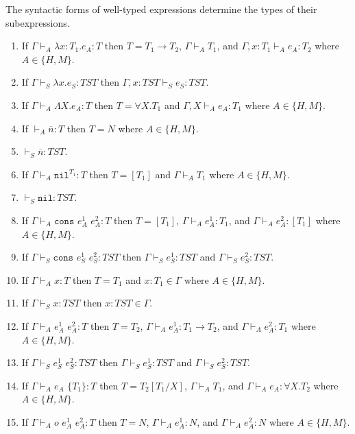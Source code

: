 \begin{lemma}
\label{i}
The syntactic forms of well-typed expressions determine the types of their subexpressions.
\begin{enumerate}
\item If $\Gamma\vdash_{A}\lambda x:T_{1}.e_{A}:T$ then $T=T_{1}\rightarrow T_{2}$, $\Gamma\vdash_{A}T_{1}$, and $\Gamma,x:T_{1}\vdash_{A}e_{A}:T_{2}$ where $A\in\lbrace H,M\rbrace$.
\item If $\Gamma\vdash_{S}\lambda x.e_{S}:TST$ then $\Gamma,x:TST\vdash_{S}e_{S}:TST$.
\item If $\Gamma\vdash_{A}\Lambda X.e_{A}:T$ then $T=\forall X.T_{1}$ and $\Gamma,X\vdash_{A}e_{A}:T_{1}$ where $A\in\lbrace H,M\rbrace$.
\item If $\vdash_{A}\overline{n}:T$ then $T=N$ where $A\in\lbrace H,M\rbrace$.
\item $\vdash_{S}\overline{n}:TST$.
\item If $\Gamma\vdash_{A}\mathtt{nil}^{T_{1}}:T$ then $T=[T_{1}]$ and $\Gamma\vdash_{A}T_{1}$ where $A\in\lbrace H,M\rbrace$.
\item $\vdash_{S}\mathtt{nil}:TST$.
\item If $\Gamma\vdash_{A}\mathtt{cons}$ $e_{A}^{1}$ $e_{A}^{2}:T$ then $T=[T_{1}]$, $\Gamma\vdash_{A}e_{A}^{1}:T_{1}$, and $\Gamma\vdash_{A}e_{A}^{2}:[T_{1}]$ where $A\in\lbrace H,M\rbrace$.
\item If $\Gamma\vdash_{S}\mathtt{cons}$ $e_{S}^{1}$ $e_{S}^{2}:TST$ then $\Gamma\vdash_{S}e_{S}^{1}:TST$ and $\Gamma\vdash_{S}e_{S}^{2}:TST$.
\item If $\Gamma\vdash_{A}x:T$ then $T=T_{1}$ and $x:T_{1}\in\Gamma$ where $A\in\lbrace H,M\rbrace$.
\item If $\Gamma\vdash_{S}x:TST$ then $x:TST\in\Gamma$.
\item If $\Gamma\vdash_{A}e_{A}^{1}$ $e_{A}^{2}:T$ then $T=T_{2}$, $\Gamma\vdash_{A}e_{A}^{1}:T_{1}\rightarrow T_{2}$, and $\Gamma\vdash_{A}e_{A}^{2}:T_{1}$ where $A\in\lbrace H,M\rbrace$.
\item If $\Gamma\vdash_{S}e_{S}^{1}$ $e_{S}^{2}:TST$ then $\Gamma\vdash_{S}e_{S}^{1}:TST$ and $\Gamma\vdash_{S}e_{S}^{2}:TST$.
\item If $\Gamma\vdash_{A}e_{A}$ $\lbrace T_{1}\rbrace:T$ then $T=T_{2}[T_{1}/X]$, $\Gamma\vdash_{A}T_{1}$, and $\Gamma\vdash_{A}e_{A}:\forall X.T_{2}$ where $A\in\lbrace H,M\rbrace$.
\item If $\Gamma\vdash_{A}o$ $e_{A}^{1}$ $e_{A}^{2}:T$ then $T=N$, $\Gamma\vdash_{A}e_{A}^{1}:N$, and $\Gamma\vdash_{A}e_{A}^{2}:N$ where $A\in\lbrace H,M\rbrace$.

\end{enumerate}
\end{lemma}
